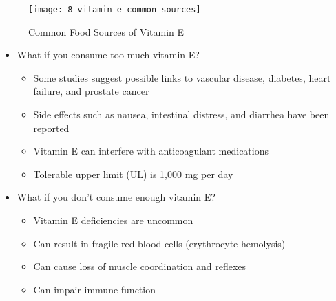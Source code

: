 \documentclass[title={Chapter 8}]{fdsn201notes}
\begin{document}
\begin{figure}[H]
	\centering
	\texttt{[image: 8\_vitamin\_e\_common\_sources]}
	\caption{Common Food Sources of Vitamin E}
	\label{fig:common-food-sources-of-vitamin-e}
\end{figure}

\begin{itemize}
	\item What if you consume too much vitamin E?
	\begin{itemize}
		\item Some studies suggest possible links to vascular disease, diabetes, heart failure, and prostate cancer
		\item Side effects such as nausea, intestinal distress, and diarrhea have been reported
		\item Vitamin E can interfere with anticoagulant medications
		\item Tolerable upper limit (UL) is 1,000 mg per day
	\end{itemize}
	\item What if you don’t consume enough vitamin E?
	\begin{itemize}
		\item Vitamin E deficiencies are uncommon
		\item Can result in fragile red blood cells (erythrocyte hemolysis)
		\item Can cause loss of muscle coordination and reflexes
		\item Can impair immune function
	\end{itemize}
\end{itemize}
\end{document}

